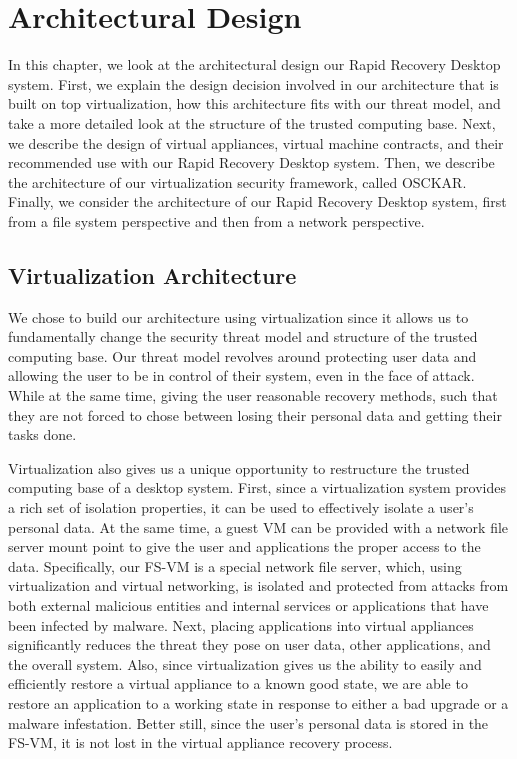 
\chapter{Architectural Design}

In this chapter, we look at the architectural design our Rapid Recovery Desktop system. First, we explain the design decision involved in our architecture that is built on top virtualization, how this architecture fits with our threat model, and take a more detailed look at the structure of the trusted computing base. Next, we describe the design of virtual appliances, virtual machine contracts, and their recommended use with our Rapid Recovery Desktop system. Then, we describe the architecture of our virtualization security framework, called OSCKAR. Finally, we consider the architecture of our Rapid Recovery Desktop system, first from a file system perspective and then from a network perspective.

\section{Virtualization Architecture}

We chose to build our architecture using virtualization since it allows us to fundamentally change the security threat model and structure of the trusted computing base. Our threat model revolves around protecting user data and allowing the user to be in control of their system, even in the face of attack. While at the same time, giving the user reasonable recovery methods, such that they are not forced to chose between losing their personal data and getting their tasks done.

Virtualization also gives us a unique opportunity to restructure the trusted computing base of a desktop system. First, since a virtualization system provides a rich set of isolation properties, it can be used to effectively isolate a user's personal data. At the same time, a guest VM can be provided with a network file server mount point to give the user and applications the proper access to the data. Specifically, our FS-VM is a special network file server, which, using virtualization and virtual networking, is isolated and protected from attacks from both external malicious entities and internal services or applications that have been infected by malware. Next, placing applications into virtual appliances significantly reduces the threat they pose on user data, other applications, and the overall system. Also, since virtualization gives us the ability to easily and efficiently restore a virtual appliance to a known good state, we are able to restore an application to a working state in response to either a bad upgrade or a malware infestation. Better still, since the user's personal data is stored in the FS-VM, it is not lost in the virtual appliance recovery process.

